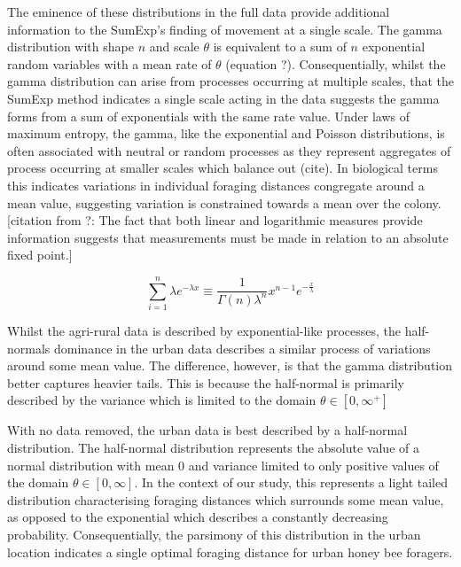 \documentclass[11pt,usenames,dvipsnames]{article}
\begin{document}
The eminence of these distributions in the full data provide additional information to the SumExp's finding of movement at a single scale. The gamma distribution with shape $n$ and scale $\theta$ is equivalent to a sum of $n$ exponential random variables with a mean rate of $\theta$ (equation ?). Consequentially, whilst the gamma distribution can arise from processes occurring at multiple scales, that the SumExp method indicates a single scale acting in the data suggests the gamma forms from a sum of exponentials with the same rate value. Under laws of maximum entropy, the gamma, like the exponential and Poisson distributions, is often associated with neutral or random processes as they represent aggregates of process occurring at smaller scales which balance out (cite). In biological terms this indicates variations in individual foraging distances congregate around a mean value, suggesting variation is constrained towards a mean over the colony. [citation from ?: The fact that both linear and logarithmic measures provide information suggests that measurements must be made in relation to an absolute fixed point.]

\begin{equation}
\sum_{i=1}^{n} \lambda e^{-\lambda x} \equiv \frac{1}{\Gamma(n)\lambda^n}x^{n-1}e^{-\frac{x}{\lambda}}
\end{equation}

Whilst the agri-rural data is described by exponential-like processes, the half-normals dominance in the urban data describes a similar process of variations around some mean value. The difference, however, is that the gamma distribution better captures heavier tails. This is because the half-normal is primarily described by the variance which is limited to the domain $\theta \in [0,\infty^+]$


With no data removed, the urban data is best described by a half-normal distribution. The half-normal distribution represents the absolute value of a normal distribution with mean 0 and variance limited to only positive values of the domain $\theta \in [0,\infty] $. In the context of our study, this represents a light tailed distribution characterising foraging distances which surrounds some mean value, as opposed to the exponential which describes a constantly decreasing probability. Consequentially, the parsimony of this distribution in the urban location indicates a single optimal foraging distance for urban honey bee foragers. 
\end{document}
